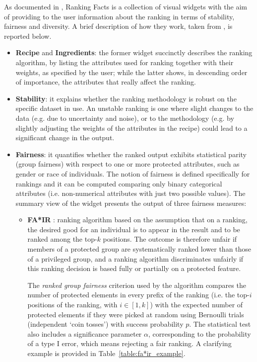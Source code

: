 As documented in \cite{yang2018nutritional}, Ranking Facts is a collection of visual widgets with the aim of providing to the user information about the ranking in terms of stability, fairness and diversity. A brief description of how they work, taken from \cite{yang2018nutritional}, is reported below.
\begin{itemize}
\item \textbf{Recipe} and \textbf{Ingredients}: the former widget succinctly describes the ranking algorithm, by listing the attributes used for ranking together with their weights, as specified by the user; while the latter shows, in descending order of importance, the attributes that really affect the ranking.
\item \textbf{Stability}: it explains whether the ranking methodology is robust on the specific dataset in use. An unstable ranking is one where slight changes to the data (e.g. due to uncertainty and noise), or to the methodology (e.g. by slightly adjusting the weights of the attributes in the recipe) could lead to a significant change in the output.
\item \textbf{Fairness}: it quantifies whether the ranked output exhibits statistical parity (group fairness) with respect to one or more protected attributes, such as gender or race of individuals. The notion of fairness is defined specifically for rankings and it can be computed comparing only binary categorical attributes (i.e. non-numerical attributes with just two possible values). The summary view of the widget presents the output of three fairness measures:

\begin{itemize}
\item \textbf{FA*IR} \cite{zehlike2017fa*ir}: ranking algorithm based on the assumption that on a ranking, the desired good for an individual is to appear in the result and to be ranked among the top-\(k\) positions. The outcome is therefore unfair if members of a protected group are systematically ranked lower than those of a privileged group, and a ranking algorithm discriminates unfairly if this ranking decision is based fully or partially on a protected feature.

The \textit{ranked group fairness} criterion used by the algorithm compares the number of protected elements in every prefix of the ranking (i.e. the top-\(i\) positions of the ranking, with \(i \in [1, k]\)) with the expected number of protected elements if they were picked at random using Bernoulli trials (independent `coin tosses') with success probability \(p\). The statistical test also includes a significance parameter \(\alpha\), corresponding to the probability of a type I error, which means rejecting a fair ranking. A clarifying example is provided in Table~\ref{table:fa*ir_example}.


\end{itemize}
\end{itemize}
